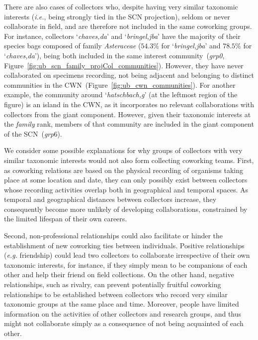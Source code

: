 There are also cases of collectors who, despite having very similar taxonomic interests (\textit{i.e.}, being strongly tied in the SCN projection), seldom or never collaborate in field, and are therefore not included in the same coworking groups. For instance, collectors
`\textit{chaves,da}' and `\textit{bringel,jba}' have the majority of their species bags composed of family \textit{Asteraceae} ($54.3\%$ for `\textit{bringel,jba}' and $78.5\%$ for `\textit{chaves,da}'), being both included in the same interest community~(\textit{grp0}, Figure~\ref{fig:ub_scn_family_projCol_communities}).
However, they have never collaborated on specimens recording, not being adjacent and belonging to distinct communities in the CWN~(Figure~\ref{fig:ub_cwn_communities}).
%
For another example, the community around `\textit{hatschbach,g}' (at the leftmost region of the figure) is an island in the CWN, as it incorporates no relevant collaborations with collectors from the giant component.
However, given their taxonomic interests at the \textit{family} rank, members of that community are included in the giant component of the SCN~(\textit{grp$6$}).


We consider some possible explanations for why groups of collectors with very similar taxonomic interests would not also form collecting coworking teams.
%
First, as coworking relations are based on the physical recording of organisms taking place at some location and date, they can only possibly exist between collectors whose recording activities overlap both in geographical and temporal spaces.
As temporal and geographical distances between collectors increase, they consequently become more unlikely of developing collaborations, constrained by the limited lifespan of their own careers.

Second, non-professional relationships could also facilitate or hinder the establishment of new coworking ties between individuals. 
Positive relationships (\textit{e.g.} friendship) could lead two collectors to collaborate irrespective of their own taxonomic interests, for instance, if they simply mean to be companions of each other and help their friend on field collections.
On the other hand, negative relationships, such as rivalry, can prevent potentially fruitful coworking relationships to be established between collectors who record very similar taxonomic groups at the same place and time.
Moreover, people have limited information on the activities of other collectors and research groups, and thus might not collaborate simply as a consequence of not being acquainted of each other.

